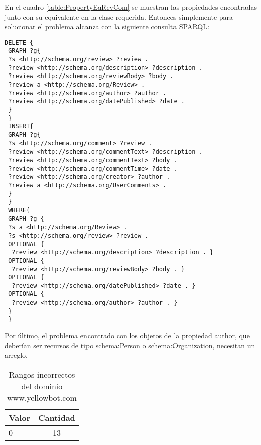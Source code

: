 En el cuadro \ref{table:PropertyEqRevCom} se muestran las propiedades encontradas junto con su equivalente en la clase requerida. 
Entonces simplemente para solucionar el problema alcanza con la siguiente consulta SPARQL:
\newpage
\begin{lstlisting}[frame=single]
 DELETE { 
 GRAPH ?g{ 
 ?s <http://schema.org/review> ?review .
 ?review <http://schema.org/description> ?description .
 ?review <http://schema.org/reviewBody> ?body .
 ?review a <http://schema.org/Review> .
 ?review <http://schema.org/author> ?author . 
 ?review <http://schema.org/datePublished> ?date .
 } 
 } 
 INSERT{ 
 GRAPH ?g{ 
 ?s <http://schema.org/comment> ?review .
 ?review <http://schema.org/commentText> ?description .
 ?review <http://schema.org/commentText> ?body .
 ?review <http://schema.org/commentTime> ?date .
 ?review <http://schema.org/creator> ?author .
 ?review a <http://schema.org/UserComments> .
 }
 }
 WHERE{
 GRAPH ?g {
 ?s a <http://schema.org/Review> .
 ?s <http://schema.org/review> ?review .
 OPTIONAL {
  ?review <http://schema.org/description> ?description . }
 OPTIONAL {
  ?review <http://schema.org/reviewBody> ?body . }
 OPTIONAL {
  ?review <http://schema.org/datePublished> ?date . }
 OPTIONAL {
  ?review <http://schema.org/author> ?author . }
 }
 }
\end{lstlisting}

Por último, el problema encontrado con los objetos de la propiedad author, que deberían ser recursos de tipo schema:Person o schema:Organization, 
necesitan un arreglo.


\begin{table}[h]
\begin{tabular}{| l | c |}\hline
 Valor & Cantidad\\\hline
 0 & 13\\\hline
\end{tabular}
\caption{Rangos incorrectos del dominio www.yellowbot.com}
\label{table:YellowBot}
\end{table}

